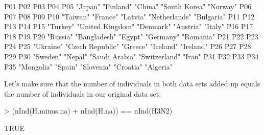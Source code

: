 \documentclass[letterpaper]{article}
\begin{document}
\begin{Schunk}
\begin{Soutput}
             P01              P02              P03              P04              P05 
         "Japan"        "Finland"          "China"    "South Korea"         "Norway" 
             P06              P07              P08              P09              P10 
        "Taiwan"         "France"         "Latvia"    "Netherlands"       "Bulgaria" 
             P11              P12              P13              P14              P15 
        "Turkey" "United Kingdom"        "Denmark"        "Austria"          "Italy" 
             P16              P17              P18              P19              P20 
        "Russia"     "Bangladesh"          "Egypt"        "Germany"        "Romania" 
             P21              P22              P23              P24              P25 
       "Ukraine" "Czech Republic"         "Greece"        "Iceland"        "Ireland" 
             P26              P27              P28              P29              P30 
        "Sweden"          "Nepal"   "Saudi Arabia"    "Switzerland"           "Iran" 
             P31              P32              P33              P34              P35 
      "Mongolia"          "Spain"       "Slovenia"        "Croatia"        "Algeria" 
\end{Soutput}
\end{Schunk}
Let's make sure that the number of individuals in both data sets added up equals the number of individuals in our original data set:
\begin{Schunk}
\begin{Sinput}
> (nInd(H.minus.na) + nInd(H.na)) == nInd(H3N2)
\end{Sinput}
\begin{Soutput}
[1] TRUE
\end{Soutput}
\end{Schunk}
\end{document}
